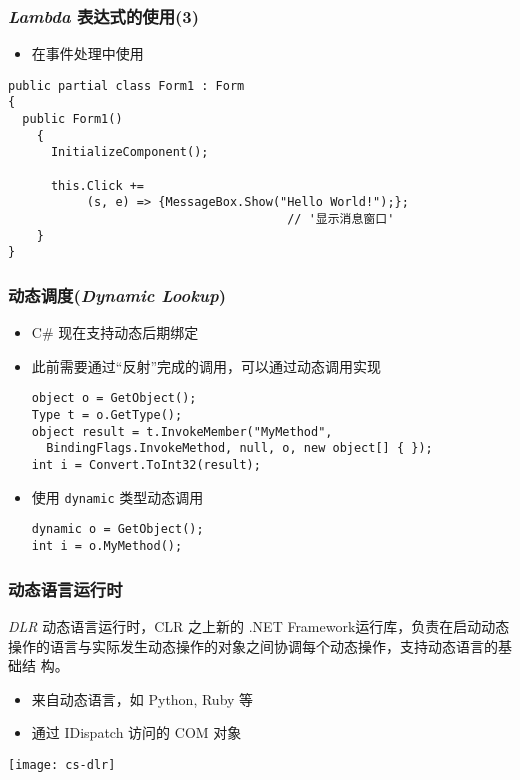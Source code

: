 \begin{frame}[fragile]
\frametitle{\textit{Lambda} 表达式的使用(3)}
\begin{itemize}
\item 在事件处理中使用
\end{itemize}
\begin{lstlisting}[escapeinside='']
public partial class Form1 : Form
{
  public Form1()
    {
      InitializeComponent();

      this.Click +=
           (s, e) => {MessageBox.Show("Hello World!");};
                                       // '显示消息窗口'
    }
}
\end{lstlisting}
\end{frame}

\begin{frame}[fragile]
\frametitle{动态调度(\textit{Dynamic Lookup})}
\begin{itemize}
\item C\# 现在支持动态后期绑定
\item 此前需要通过“反射”完成的调用，可以通过动态调用实现
\begin{lstlisting}
object o = GetObject();
Type t = o.GetType();
object result = t.InvokeMember("MyMethod", 
  BindingFlags.InvokeMethod, null, o, new object[] { });
int i = Convert.ToInt32(result);
\end{lstlisting}
\item 使用 \lstinline|dynamic| 类型动态调用
\begin{lstlisting}
dynamic o = GetObject();
int i = o.MyMethod();
\end{lstlisting}
\end{itemize}
\end{frame}

\begin{frame}
\frametitle{动态语言运行时}
\begin{block}{\textit{DLR}}
  \CJKindent 动态语言运行时，CLR 之上新的 .NET Framework运行库，负责在启动动态
  操作的语言与实际发生动态操作的对象之间协调每个动态操作，支持动态语言的基础结
  构。
\end{block}
\begin{itemize}
\item 来自动态语言，如 Python, Ruby 等
\item 通过 IDispatch 访问的 COM 对象
\end{itemize}
\centering \texttt{[image: cs-dlr]}

\end{frame}


